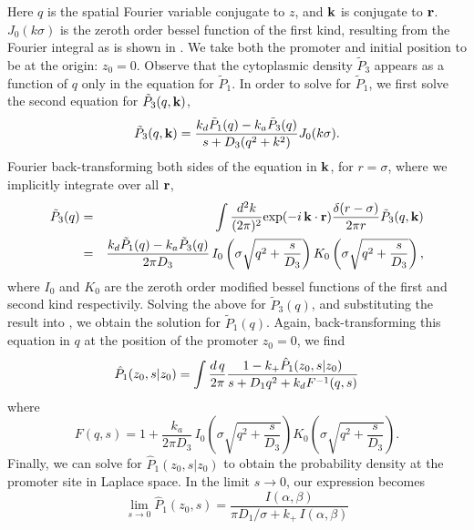 Here $q$ is the spatial Fourier variable conjugate to $z$, and ${\bf k}$ is conjugate to ${\bf r}$. $J_0(k\sigma)$ is the zeroth order bessel function of the first kind, resulting from the Fourier integral as is shown in . We take both the promoter and initial position to be at the origin: $z_0 = 0$. Observe that the cytoplasmic density $\tilde{P}_3$ appears as a function of $q$ only in the equation for $\tilde{P}_1$. In order to solve for $\tilde{P}_1$, we first solve the second equation for $\tilde{P}_3(q,{\bf k})$, 
\begin{equation}
 \tilde{P}_3(q,{\bf k}) = \frac{k_d \tilde{P}_1(q) - k_a\tilde{P}_3(q)}{s + D_3(q^2 + k^2)} J_{0}(k \sigma ).
\end{equation}
Fourier back-transforming both sides of the equation in ${\bf k}$, for $r=\sigma$, where we implicitly integrate over all ${\bf r}$,
\begin{eqnarray}
 \elabel{FourierBackC}
 \tilde{P}_3(q) & = & \int \frac{d^2 k}{(2 \pi)^2} {\rm exp}(-i\,{\bf k}\cdot{\bf r}) \frac{\delta(r-\sigma)}{2\pi r} \tilde{P}_3(q,{\bf k}) \\
 & = & \frac{k_d \tilde{P}_1(q) - k_a\tilde{P}_3(q)}{2 \pi D_3} \, I_{0}\left( \sigma \sqrt{q^2 + \frac{s}{D_3}} \right) K_{0}\left( \sigma \sqrt{q^2 + \frac{s}{D_3}} \right),
\end{eqnarray}
where $I_0$ and $K_0$ are the zeroth order modified bessel functions of the first and second kind respectivily. Solving the above for $\tilde{P}_3(q)$, and substituting the result into , we obtain the solution for $\tilde{P}_1(q)$. Again, back-transforming this equation in $q$ at the position of the promoter $z_0=0$, we find
\begin{equation}
 \hat{P}_1(z_0,s|z_0) = \int \frac{d\,q}{2 \pi} \frac{1 - k_+ \hat{P}_1(z_0,s|z_0)}{s + D_1 q^2+k_d F^{-1}(q,s)}
 \elabel{FDE_dna2}
\end{equation}
where
\begin{equation}
F(q,s) = 1 + \frac{k_a}{2 \pi D_3} \, I_{0}\left( \sigma \sqrt{q^2 + \frac{s}{D_3}} \right) K_{0}\left( \sigma \sqrt{q^2 + \frac{s}{D_3}} \right).
\end{equation}
Finally, we can solve  for $\hat{P}_1(z_0, s|z_0)$ to obtain the probability density at the promoter site in Laplace space. In the limit $s \to 0$, our expression becomes
\begin{equation}
 \lim_{s \to 0} \hat{P}_1(z_0, s) = \frac{I(\alpha,\beta)}{\pi D_1 / \sigma + k_+ \, I(\alpha,\beta)}
\end{equation}
